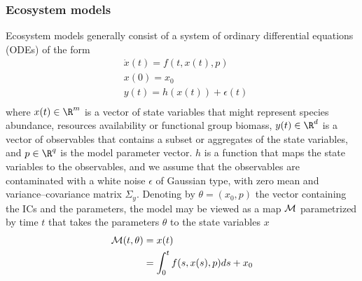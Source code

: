 \subsubsection{Ecosystem models}
Ecosystem models generally consist of a system of ordinary differential equations (ODEs) of the form
\begin{equation}\label{eq:prob_statement}
    \begin{split}
        &\dot{x}(t) = f(t, x(t), p)\\
        &x(0) = x_0\\
        &y(t) = h(x(t)) + \epsilon(t)\\
    \end{split}
\end{equation}
%
where $x(t) \in \R^m $ is a vector of state variables that might represent species abundance, resources availability or functional group biomass, $y(t) \in \R^d$ is a vector of observables that contains a subset or aggregates of the state variables, and $p \in \R^q$ is the model parameter vector.
% 
$h$ is a function that maps the state variables to the observables, and we assume that the observables are contaminated with a white noise $\epsilon$ of Gaussian type, with zero mean and variance--covariance matrix $\Sigma_y$. 
%
Denoting by $\theta = (x_0, p)$ the vector containing the ICs and the parameters, the model may be viewed as a map $\mathcal{M}$ parametrized by time $t$ that takes the parameters $\theta$ to the state variables $x$
\begin{equation}
\begin{split}
        \mathcal{M}(t,\theta) &= x(t) \\
            &= \int_0^t f(s, x(s), p) ds + x_0
\end{split}
\end{equation}

